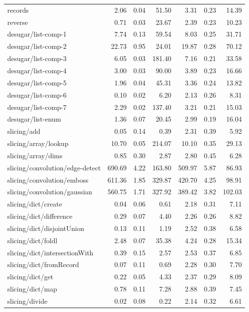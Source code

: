 \begin{longtable}{lrrrrrr}
records & 2.06 & 0.04 & 51.50 & 3.31 & 0.23 & 14.39 \\
reverse & 0.71 & 0.03 & 23.67 & 2.39 & 0.23 & 10.23 \\
desugar/list-comp-1 & 7.74 & 0.13 & 59.54 & 8.03 & 0.25 & 31.71 \\
desugar/list-comp-2 & 22.73 & 0.95 & 24.01 & 19.87 & 0.28 & 70.12 \\
desugar/list-comp-3 & 6.05 & 0.03 & 181.40 & 7.16 & 0.21 & 33.58 \\
desugar/list-comp-4 & 3.00 & 0.03 & 90.00 & 3.89 & 0.23 & 16.66 \\
desugar/list-comp-5 & 1.96 & 0.04 & 45.31 & 3.36 & 0.24 & 13.82 \\
desugar/list-comp-6 & 0.10 & 0.02 & 6.20 & 2.13 & 0.26 & 8.31 \\
desugar/list-comp-7 & 2.29 & 0.02 & 137.40 & 3.21 & 0.21 & 15.03 \\
desugar/list-enum & 1.36 & 0.07 & 20.45 & 2.99 & 0.19 & 16.04 \\
slicing/add & 0.05 & 0.14 & 0.39 & 2.31 & 0.39 & 5.92 \\
slicing/array/lookup & 10.70 & 0.05 & 214.07 & 10.10 & 0.35 & 29.13 \\
slicing/array/dims & 0.85 & 0.30 & 2.87 & 2.80 & 0.45 & 6.28 \\
slicing/convolution/edge-detect & 690.69 & 4.22 & 163.80 & 509.97 & 5.87 & 86.93 \\
slicing/convolution/emboss & 611.36 & 1.85 & 329.87 & 420.70 & 4.25 & 98.91 \\
slicing/convolution/gaussian & 560.75 & 1.71 & 327.92 & 389.42 & 3.82 & 102.03 \\
slicing/dict/create & 0.04 & 0.06 & 0.61 & 2.18 & 0.31 & 7.11 \\
slicing/dict/difference & 0.29 & 0.07 & 4.40 & 2.26 & 0.26 & 8.82 \\
slicing/dict/disjointUnion & 0.13 & 0.11 & 1.19 & 2.52 & 0.38 & 6.58 \\
slicing/dict/foldl & 2.48 & 0.07 & 35.38 & 4.24 & 0.28 & 15.34 \\
slicing/dict/intersectionWith & 0.39 & 0.15 & 2.57 & 2.53 & 0.37 & 6.85 \\
slicing/dict/fromRecord & 0.07 & 0.11 & 0.69 & 2.28 & 0.30 & 7.70 \\
slicing/dict/get & 0.22 & 0.05 & 4.33 & 2.37 & 0.29 & 8.09 \\
slicing/dict/map & 0.78 & 0.11 & 7.28 & 2.88 & 0.39 & 7.45 \\
slicing/divide & 0.02 & 0.08 & 0.22 & 2.14 & 0.32 & 6.61 \\

\end{longtable}
